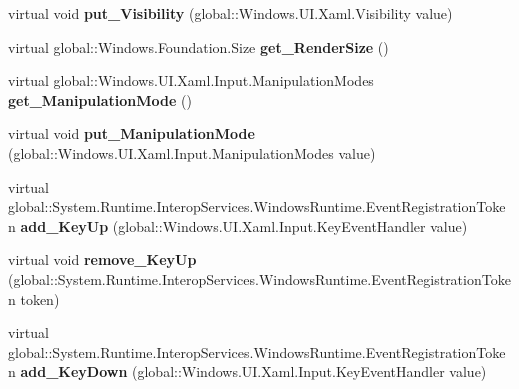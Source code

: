 \begin{DoxyCompactItemize}
\item 
\mbox{\label{class_windows_1_1_u_i_1_1_xaml_1_1_u_i_element_aa21b9a45ef782cd5fe687bf2ad1b542a}} 
virtual void {\bfseries put\+\_\+\+Visibility} (global\+::\+Windows.\+U\+I.\+Xaml.\+Visibility value)
\item 
\mbox{\label{class_windows_1_1_u_i_1_1_xaml_1_1_u_i_element_ae8754f086fb49dc408bd75c4277a1aaa}} 
virtual global\+::\+Windows.\+Foundation.\+Size {\bfseries get\+\_\+\+Render\+Size} ()
\item 
\mbox{\label{class_windows_1_1_u_i_1_1_xaml_1_1_u_i_element_a144176607f6318a776be9a5bd0836be5}} 
virtual global\+::\+Windows.\+U\+I.\+Xaml.\+Input.\+Manipulation\+Modes {\bfseries get\+\_\+\+Manipulation\+Mode} ()
\item 
\mbox{\label{class_windows_1_1_u_i_1_1_xaml_1_1_u_i_element_a2d57a47a49d348fcb616d78e70fbb023}} 
virtual void {\bfseries put\+\_\+\+Manipulation\+Mode} (global\+::\+Windows.\+U\+I.\+Xaml.\+Input.\+Manipulation\+Modes value)
\item 
\mbox{\label{class_windows_1_1_u_i_1_1_xaml_1_1_u_i_element_ae3fbd9d6083ca5ff6d54b03c98f3ddd0}} 
virtual global\+::\+System.\+Runtime.\+Interop\+Services.\+Windows\+Runtime.\+Event\+Registration\+Token {\bfseries add\+\_\+\+Key\+Up} (global\+::\+Windows.\+U\+I.\+Xaml.\+Input.\+Key\+Event\+Handler value)
\item 
\mbox{\label{class_windows_1_1_u_i_1_1_xaml_1_1_u_i_element_a9b0df5770c1290041beafa550462cc33}} 
virtual void {\bfseries remove\+\_\+\+Key\+Up} (global\+::\+System.\+Runtime.\+Interop\+Services.\+Windows\+Runtime.\+Event\+Registration\+Token token)
\item 
\mbox{\label{class_windows_1_1_u_i_1_1_xaml_1_1_u_i_element_a58b82f2b844e4c525c9caa9f4dea423b}} 
virtual global\+::\+System.\+Runtime.\+Interop\+Services.\+Windows\+Runtime.\+Event\+Registration\+Token {\bfseries add\+\_\+\+Key\+Down} (global\+::\+Windows.\+U\+I.\+Xaml.\+Input.\+Key\+Event\+Handler value)

\end{DoxyCompactItemize}
